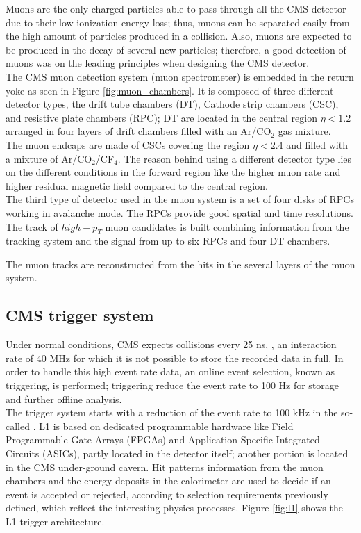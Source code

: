 \noindent Muons are the only charged particles able to pass through all the CMS detector due to their low ionization energy loss; thus, muons can be separated easily from the high amount of particles produced in a \pp collision. Also, muons are expected to be produced in the decay of several new particles; therefore, a good detection of muons was on the leading principles when designing the CMS detector.\\

\noindent The CMS muon detection system (muon spectrometer) is embedded in the return yoke as seen in Figure \ref{fig:muon_chambers}. It is composed of three different detector types, the drift tube chambers (DT), Cathode strip chambers (CSC), and resistive plate chambers (RPC); DT are located in the central region $\eta< 1.2$ arranged in four layers of drift chambers filled with an Ar/CO$_2$ gas mixture.\\

\noindent The muon endcaps are made of CSCs covering the region $\eta< 2.4$ and filled with a mixture of Ar/CO$_2$/CF$_4$. The reason behind using a different detector type lies on the different conditions in the forward region like the higher muon rate and higher residual magnetic field compared to the central region.\\

\noindent The third type of detector used in the muon system is a set of four disks of RPCs working in avalanche mode. The RPCs provide good spatial and time resolutions. The track of $high-p_T$ muon candidates is built combining information from the tracking system and the signal from up to six RPCs and four DT chambers.

\noindent The muon tracks are reconstructed from the hits in the several layers of the muon system. 


\subsection{CMS trigger system}

\noindent Under normal conditions, CMS expects \pp collisions every 25 ns, \ie, an interaction rate of 40 MHz for which it is not possible to store the recorded data in full. In order to handle this high event rate data, an online event selection, known as triggering, is performed; triggering reduce the event rate to 100 Hz for storage and further offline analysis.\\        

\noindent The trigger system starts with a reduction of the event rate to 100 kHz in the so-called . L1 is based on dedicated programmable hardware like Field Programmable Gate Arrays (FPGAs) and Application Specific Integrated Circuits (ASICs), partly located in the detector itself; another portion is located in the CMS under-ground cavern. Hit patterns information from the muon chambers and the energy deposits in the calorimeter are used to decide if an event is accepted or rejected, according to selection requirements previously defined, which reflect the interesting physics processes. Figure \ref{fig:l1} shows the L1 trigger architecture.\\

